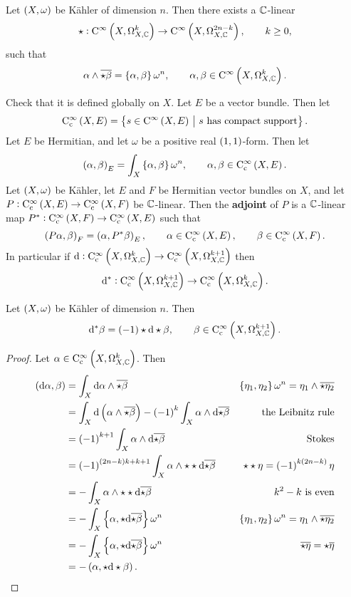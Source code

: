 \begin{lemma}
Let $ \br{X, \omega} $ be K\"ahler of dimension $ n $. Then there exists a $ \mathbb{C} $-linear
$$ \star : \COC{X}{k} \to \COC{X}{2n - k}, \qquad k \ge 0, $$
such that
$$ \alpha \wedge \overline{\star\beta} = \cbr{\alpha, \beta}\omega^n, \qquad \alpha, \beta \in \COC{X}{k}. $$
\end{lemma}

Check that it is defined globally on $ X $. Let $ E $ be a vector bundle. Then let
$$ \Cic{X, E} = \cbr{s \in \Ci{X, E} \st s \ \text{has compact support}}. $$
Let $ E $ be Hermitian, and let $ \omega $ be a positive real $ \br{1, 1} $-form. Then let
$$ \br{\alpha, \beta}_E = \int_X \cbr{\alpha, \beta}\omega^n, \qquad \alpha, \beta \in \Cic{X, E}. $$
Let $ \br{X, \omega} $ be K\"ahler, let $ E $ and $ F $ be Hermitian vector bundles on $ X $, and let $ P : \Cic{X, E} \to \Cic{X, F} $ be $ \mathbb{C} $-linear. Then the \textbf{adjoint} of $ P $ is a $ \mathbb{C} $-linear map $ P^* : \Cic{X, F} \to \Cic{X, E} $ such that
$$ \br{P\alpha, \beta}_F = \br{\alpha, P^*\beta}_E, \qquad \alpha \in \Cic{X, E}, \qquad \beta \in \Cic{X, F}. $$
In particular if $ \d : \COCc{X}{k} \to \COCc{X}{k + 1} $ then
$$ \d^* : \COCc{X}{k + 1} \to \COCc{X}{k}. $$

\begin{lemma}
\label{lem:6.11}
Let $ \br{X, \omega} $ be K\"ahler of dimension $ n $. Then
$$ \d^*\beta = \br{-1}\star\d\star\beta, \qquad \beta \in \COCc{X}{k + 1}. $$
\end{lemma}


\begin{proof}
Let $ \alpha \in \COCc{X}{k} $. Then
\begin{align*}
\br{\d\alpha, \beta}
& = \int_X \d\alpha \wedge \overline{\star\beta} & \cbr{\eta_1, \eta_2}\omega^n = \eta_1 \wedge \overline{\star\eta_2} \\
& = \int_X \d\br{\alpha \wedge \overline{\star\beta}} - \br{-1}^k\int_X \alpha \wedge \d\overline{\star\beta} & \text{the Leibnitz rule} \\
& = \br{-1}^{k + 1}\int_X \alpha \wedge \d\overline{\star\beta} & \text{Stokes} \\
& = \br{-1}^{\br{2n - k}k + k + 1}\int_X \alpha \wedge \star\star\d\overline{\star\beta} & \star\star\eta = \br{-1}^{k\br{2n - k}}\eta \\
& = -\int_X \alpha \wedge \star\star\d\overline{\star\beta} & k^2 - k \ \text{is even} \\
& = -\int_X \cbr{\alpha, \star\d\overline{\star\beta}}\omega^n & \cbr{\eta_1, \eta_2}\omega^n = \eta_1 \wedge \overline{\star\eta_2} \\
& = -\int_X \cbr{\alpha, \star\d\overline{\star\beta}}\omega^n & \overline{\star\eta} = \star\overline{\eta} \\
& = -\br{\alpha, \star\d\star\beta}.
\end{align*}
\end{proof}

